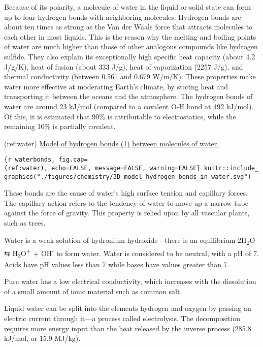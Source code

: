 \documentclass[
]{article}
\begin{document}
Because of its polarity, a molecule of water in the liquid or solid
state can form up to four hydrogen bonds with neighboring molecules.
Hydrogen bonds are about ten times as strong as the Van der Waals force
that attracts molecules to each other in most liquids. This is the
reason why the melting and boiling points of water are much higher than
those of other analogous compounds like hydrogen sulfide. They also
explain its exceptionally high specific heat capacity (about 4.2 J/g/K),
heat of fusion (about 333 J/g), heat of vaporization (2257 J/g), and
thermal conductivity (between 0.561 and 0.679 W/m/K). These properties
make water more effective at moderating Earth's climate, by storing heat
and transporting it between the oceans and the atmosphere. The hydrogen
bonds of water are around 23 kJ/mol (compared to a covalent O-H bond at
492 kJ/mol). Of this, it is estimated that 90\% is attributable to
electrostatics, while the remaining 10\% is partially covalent.

(ref:water)
\href{https://commons.wikimedia.org/wiki/File:3D_model_hydrogen_bonds_in_water.svg}{Model
of hydrogen bonds (1) between molecules of water.}

\texttt{\{r\ waterbonds,\ fig.cap=\textquotesingle{}(ref:water)\textquotesingle{},\ echo=FALSE,\ message=FALSE,\ warning=FALSE\}\ knitr::include\_graphics("./figures/chemistry/3D\_model\_hydrogen\_bonds\_in\_water.svg")}

These bonds are the cause of water's high surface tension and capillary
forces. The capillary action refers to the tendency of water to move up
a narrow tube against the force of gravity. This property is relied upon
by all vascular plants, such as trees.

Water is a weak solution of hydronium hydroxide - there is an
equilibrium 2H\textsubscript{2}O ⇆
H\textsubscript{3}O\textsuperscript{+} + OH\textsuperscript{-} to form
water. Water is considered to be neutral, with a pH of 7. Acids have pH
values less than 7 while bases have values greater than 7.

Pure water has a low electrical conductivity, which increases with the
dissolution of a small amount of ionic material such as common salt.

Liquid water can be split into the elements hydrogen and oxygen by
passing an electric current through it---a process called electrolysis.
The decomposition requires more energy input than the heat released by
the inverse process (285.8 kJ/mol, or 15.9 MJ/kg).
\end{document}

